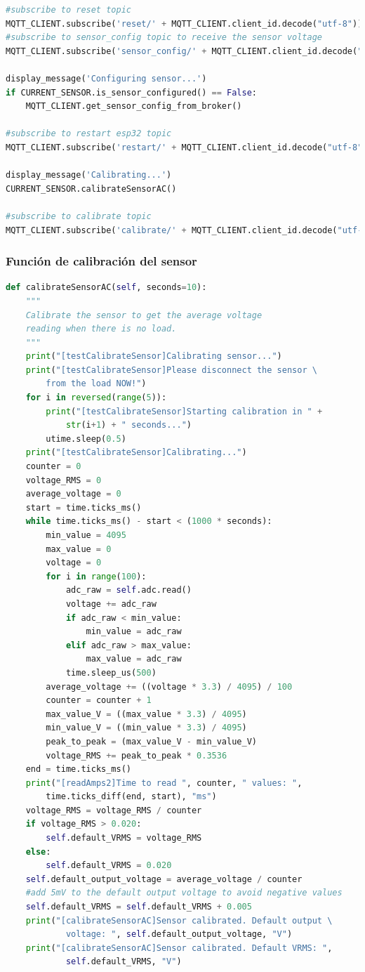 \begin{titlepage}
\begin{lstlisting}[language=python]
#subscribe to reset topic
MQTT_CLIENT.subscribe('reset/' + MQTT_CLIENT.client_id.decode("utf-8"))
#subscribe to sensor_config topic to receive the sensor voltage
MQTT_CLIENT.subscribe('sensor_config/' + MQTT_CLIENT.client_id.decode("utf-8"))

display_message('Configuring sensor...')
if CURRENT_SENSOR.is_sensor_configured() == False:
	MQTT_CLIENT.get_sensor_config_from_broker()

#subscribe to restart esp32 topic
MQTT_CLIENT.subscribe('restart/' + MQTT_CLIENT.client_id.decode("utf-8"))

display_message('Calibrating...')
CURRENT_SENSOR.calibrateSensorAC()

#subscribe to calibrate topic
MQTT_CLIENT.subscribe('calibrate/' + MQTT_CLIENT.client_id.decode("utf-8"))
\end{lstlisting}

\subsubsection{Función de calibración del sensor}
\begin{lstlisting}[language=python]
def calibrateSensorAC(self, seconds=10):
	"""
	Calibrate the sensor to get the average voltage 
	reading when there is no load.
	"""
	print("[testCalibrateSensor]Calibrating sensor...")
	print("[testCalibrateSensor]Please disconnect the sensor \
		from the load NOW!")
	for i in reversed(range(5)):
		print("[testCalibrateSensor]Starting calibration in " + 
			str(i+1) + " seconds...")
		utime.sleep(0.5)
	print("[testCalibrateSensor]Calibrating...")
	counter = 0
	voltage_RMS = 0
	average_voltage = 0
	start = time.ticks_ms()
	while time.ticks_ms() - start < (1000 * seconds):
		min_value = 4095
		max_value = 0
		voltage = 0
		for i in range(100):
			adc_raw = self.adc.read()
			voltage += adc_raw
			if adc_raw < min_value:
				min_value = adc_raw
			elif adc_raw > max_value:
				max_value = adc_raw
			time.sleep_us(500)
		average_voltage += ((voltage * 3.3) / 4095) / 100
		counter = counter + 1
		max_value_V = ((max_value * 3.3) / 4095)
		min_value_V = ((min_value * 3.3) / 4095)
		peak_to_peak = (max_value_V - min_value_V)
		voltage_RMS += peak_to_peak * 0.3536
	end = time.ticks_ms()
	print("[readAmps2]Time to read ", counter, " values: ", 
		time.ticks_diff(end, start), "ms")
	voltage_RMS = voltage_RMS / counter
	if voltage_RMS > 0.020:
		self.default_VRMS = voltage_RMS
	else:
		self.default_VRMS = 0.020
	self.default_output_voltage = average_voltage / counter
	#add 5mV to the default output voltage to avoid negative values
	self.default_VRMS = self.default_VRMS + 0.005
	print("[calibrateSensorAC]Sensor calibrated. Default output \
			voltage: ", self.default_output_voltage, "V")
	print("[calibrateSensorAC]Sensor calibrated. Default VRMS: ", 
			self.default_VRMS, "V")
\end{lstlisting}


\end{titlepage}
